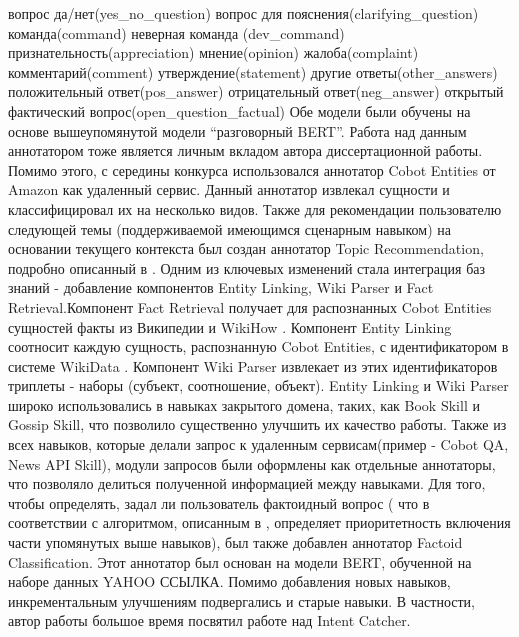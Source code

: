 вопрос да/нет(yes_no_question)
вопрос для пояснения(clarifying_question)
команда(command)
неверная команда (dev_command)
признательность(appreciation)
мнение(opinion)
жалоба(complaint)
комментарий(comment)
утверждение(statement)
другие ответы(other_answers)
положительный ответ(pos_answer)
отрицательный ответ(neg_answer)
открытый фактический вопрос(open_question_factual)
Обе модели были обучены на основе вышеупомянутой модели “разговорный BERT”.  Работа над данным аннотатором тоже является личным вкладом автора диссертационной работы. 
Помимо этого, с середины конкурса использовался аннотатор Cobot Entities от Amazon как удаленный сервис. Данный аннотатор извлекал сущности и классифицировал их на несколько видов.
Также для рекомендации пользователю следующей темы (поддерживаемой имеющимся сценарным навыком) на основании текущего контекста был создан аннотатор Topic Recommendation, подробно описанный в \cite{Baymurzina_Kuznetsov_Evseev_Karpov_Sagirova_Peganov_Ignatov_Ermakova_Cherniavskii_Kumeyko_et al._2021}.
Одним из ключевых изменений стала интеграция баз знаний - добавление компонентов Entity Linking, Wiki Parser и Fact Retrieval.Компонент Fact Retrieval получает для распознанных Cobot Entities сущностей факты из Википедии и WikiHow \cite{wikiHow: How-to instructions you can trust.}.  Компонент Entity Linking соотносит каждую сущность, распознанную Cobot Entities, с идентификатором в системе WikiData \cite{Vrandečić_Krötzsch_2014}. Компонент Wiki Parser извлекает из этих идентификаторов триплеты - наборы (субъект, соотношение, объект). Entity Linking и Wiki Parser широко использовались в навыках закрытого домена, таких, как Book Skill и Gossip Skill, что позволило существенно улучшить их качество работы.
Также из всех навыков, которые делали запрос к удаленным сервисам(пример -  Cobot QA, News API Skill), модули запросов были оформлены как отдельные аннотаторы, что позволяло делиться полученной информацией между навыками.
Для того, чтобы определять, задал ли пользователь фактоидный вопрос ( что в соответствии с алгоритмом, описанным в \cite{Baymurzina_Kuznetsov_Evseev_Karpov_Sagirova_Peganov_Ignatov_Ermakova_Cherniavskii_Kumeyko_et al._2021}, определяет приоритетность включения части упомянутых выше навыков), был также добавлен аннотатор Factoid Classification. Этот аннотатор был основан на модели BERT, обученной на наборе данных YAHOO ССЫЛКА.
Помимо добавления новых навыков, инкрементальным улучшениям подвергались и старые навыки. В частности, автор работы большое время посвятил работе над Intent Catcher. 

